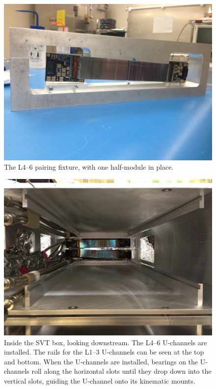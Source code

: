 \begin{figure}[ht]
    \includegraphics[width=\textwidth]{detector/figs/pairing_l456}
    \caption{The L4--6 pairing fixture, with one half-module in place.}
    \label{fig:l456}
\end{figure}

\begin{figure}[ht]
    \includegraphics[angle=90,width=\textwidth]{detector/figs/drawers}
    \caption{Inside the SVT box, looking downstream.
    The L4--6 U-channels are installed.
The rails for the L1--3 U-channels can be seen at the top and bottom. When the U-channels are installed, bearings on the U-channels roll along the horizontal slots until they drop down into the vertical slots, guiding the U-channel onto its kinematic mounts.}
    \label{fig:drawers}
\end{figure}

